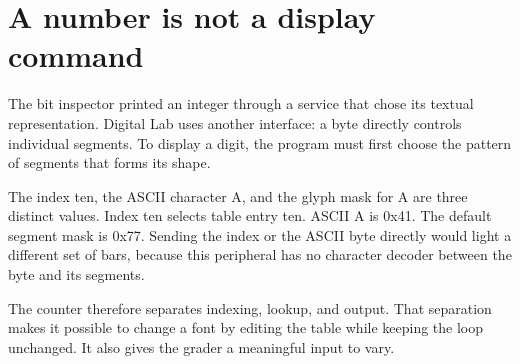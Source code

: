 \section{A number is not a display
  command}\label{005-seven-segment-counter-p00-a-number-is-not-a-display-command}

The bit inspector printed an integer through a service that chose its
textual representation. Digital Lab uses another interface: a byte
directly controls individual segments. To display a digit, the program
must first choose the pattern of segments that forms its shape.

The index ten, the ASCII character A, and the glyph mask for A are three
distinct values. Index ten selects table entry ten. ASCII A is 0x41. The
default segment mask is 0x77. Sending the index or the ASCII byte
directly would light a different set of bars, because this peripheral
has no character decoder between the byte and its segments.

The counter therefore separates indexing, lookup, and output. That
separation makes it possible to change a font by editing the table while
keeping the loop unchanged. It also gives the grader a meaningful input
to vary.
